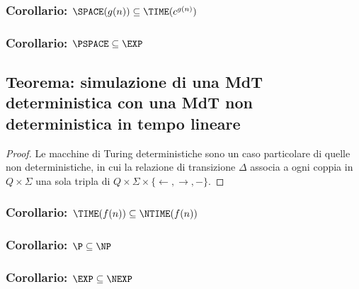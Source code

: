 \subsubsection{Corollario: $\SPACE(g(n)) \subseteq \TIME(c^{g(n)})$}
\subsubsection{Corollario: $\PSPACE \subseteq \EXP$}

\subsection{Teorema: simulazione di una MdT deterministica con una MdT non deterministica in tempo lineare}
\begin{proof}
Le macchine di Turing deterministiche sono un caso particolare di quelle non deterministiche, in cui la relazione di transizione $\Delta$ associa a ogni coppia in $Q \times \Sigma$ una sola tripla di $Q \times \Sigma \times \{\leftarrow, \rightarrow, -\}$.
\end{proof}
\subsubsection{Corollario: $\TIME(f(n)) \subseteq \NTIME(f(n))$}
\subsubsection{Corollario: $\P \subseteq \NP$}
\subsubsection{Corollario: $\EXP \subseteq \NEXP$}


